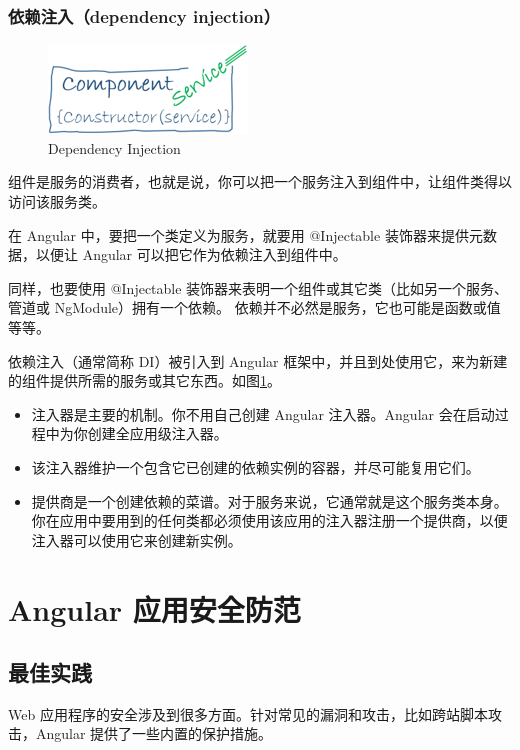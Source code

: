 \documentclass[a4paper,twoside]{ctexbook}
\begin{document}
\section{依赖注入（dependency injection）}

\begin{figure}
  \centering
  \includegraphics[scale=.7]{figs/dependency-injection.png}
  \caption{Dependency Injection}
  \label{fig:di}
\end{figure}

组件是服务的消费者，也就是说，你可以把一个服务注入到组件中，让组件类得以访问该服务类。

在 Angular 中，要把一个类定义为服务，就要用 @Injectable 装饰器来提供元数据，以便让 Angular 可以把它作为依赖注入到组件中。

同样，也要使用 @Injectable 装饰器来表明一个组件或其它类（比如另一个服务、管道或 NgModule）拥有一个依赖。 依赖并不必然是服务，它也可能是函数或值等等。

依赖注入（通常简称 DI）被引入到 Angular 框架中，并且到处使用它，来为新建的组件提供所需的服务或其它东西。如图\ref{fig:di}。

\begin{itemize}
  \item 注入器是主要的机制。你不用自己创建 Angular 注入器。Angular 会在启动过程中为你创建全应用级注入器。
  \item 该注入器维护一个包含它已创建的依赖实例的容器，并尽可能复用它们。
  \item 提供商是一个创建依赖的菜谱。对于服务来说，它通常就是这个服务类本身。你在应用中要用到的任何类都必须使用该应用的注入器注册一个提供商，以便注入器可以使用它来创建新实例。
\end{itemize}


\part{Angular 应用安全防范}


\chapter{最佳实践}

Web 应用程序的安全涉及到很多方面。针对常见的漏洞和攻击，比如跨站脚本攻击，Angular 提供了一些内置的保护措施。
\end{document}
